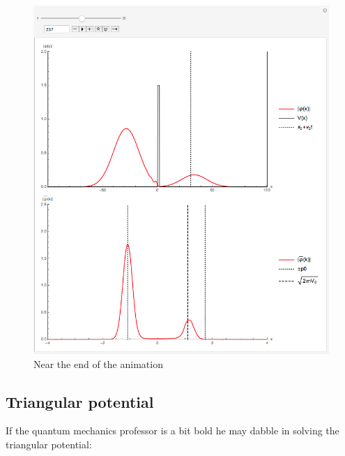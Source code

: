\documentclass[titlepage]{article}
\begin{document}
\begin{figure}[ht]
\centering
\includegraphics[scale=0.5,center]{images/square3.png}
\caption{Near the end of the animation}
\label{fig:2d}
\end{figure}
\FloatBarrier

\subsection{Triangular potential}

If the quantum mechanics professor is a bit bold he may dabble in solving the triangular potential:
\end{document}
